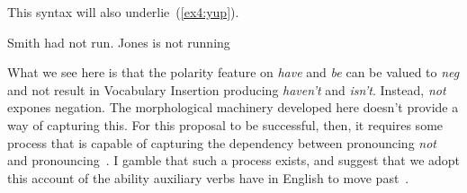 This syntax will also underlie~(\ref{ex4:yup}).
\begin{exe}
	\raggedright
	\ex \label{ex4:yup}
	\begin{xlist}
		\ex Smith had not run.
		\ex Jones is not running
	\end{xlist}
\end{exe}
What we see here is that the polarity feature on \emph{have} and \emph{be} can be valued to \emph{neg} and not result in Vocabulary Insertion producing \emph{haven't} and \emph{isn't}. Instead, \emph{not} expones negation. The morphological machinery developed here doesn't provide a way of capturing this. For this proposal to be successful, then, it requires some process that is capable of capturing the dependency between pronouncing \emph{not} and pronouncing~. I gamble that such a process exists, and suggest that we adopt this account of the ability auxiliary verbs have in English to move past~.

